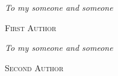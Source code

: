 
\begin{center}
    \thispagestyle{empty}
    
    \vspace*{\fill}
    
    \textit{To my someone and someone}
    
    \begin{flushright}
        {\sffamily\scshape First Author}
    \end{flushright}
    
    \bigskip
    
    \textit{To my someone and someone}
    
    \begin{flushright}
        {\sffamily\scshape Second Author}
    \end{flushright}
    
    \vspace*{\fill}
\end{center}
